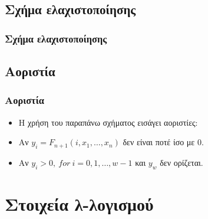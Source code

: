 \documentclass{beamer}
\begin{document}
\subsection{Σχήμα ελαχιστοποίησης}

\begin{frame}
        \frametitle{Σχήμα ελαχιστοποίησης}
\end{frame}

\subsection{Αοριστία}

\begin{frame}
        \frametitle{Αοριστία}
        \begin{itemize}
    	    \item Η χρήση του παραπάνω σχήματος εισάγει αοριστίες:
    	    \pause
            \item Αν $y_i = F_{n+1}(i, x_1,\ldots, x_n)$ δεν είναι ποτέ ίσο με $0$.
            \pause
            \item Αν $y_i > 0,\:for\:i=0,1,\ldots,w-1$ και $y_w$ δεν ορίζεται.
        \end{itemize}
\end{frame}

\section{Στοιχεία λ-λογισμού}
\end{document}
